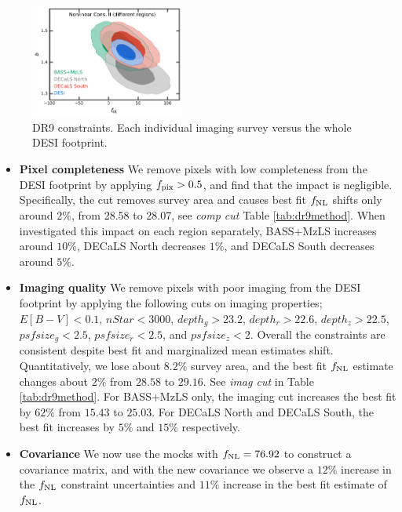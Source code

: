 \begin{figure}
    \centering
    \includegraphics[width=0.45\textwidth]{figures/mcmc_dr9regions.pdf} 
    \caption{DR9 constraints. Each individual imaging survey versus the whole DESI footprint.}\label{fig:mcmc_dr9reg}
\end{figure}

\begin{itemize}
\item \textbf{Pixel completeness}
We remove pixels with low completeness from the DESI footprint by applying $f_{\rm pix}>0.5$, and find that the impact is negligible. Specifically, the cut removes  survey area and causes best fit $f_{\rm NL}$ shifts only around $2\%$, from 28.58 to 28.07, see \textit{comp cut} Table \ref{tab:dr9method}. When investigated this impact on each region separately, BASS+MzLS increases around $10\%$, DECaLS North decreases $1\%$, and DECaLS South decreases around $5\%$.

\item \textbf{Imaging quality}
We remove pixels with poor imaging from the DESI footprint by applying the following cuts on imaging properties; $E[B-V]<0.1$, $nStar < 3000$, $depth_{g} > 23.2$, $depth_{r} > 22.6$, $depth_{z} > 22.5$, $psfsize_{g}<2.5$, $psfsize_{r}<2.5$, and $psfsize_{z}<2$. Overall the constraints are consistent despite best fit and marginalized mean estimates shift. Quantitatively, we lose about $8.2\%$ survey area, and the best fit $f_{\rm NL}$ estimate changes about $2\%$ from $28.58$ to $29.16$. See \textit{imag cut} in Table \ref{tab:dr9method}. For BASS+MzLS only, the imaging cut increases the best fit by $62\%$ from $15.43$ to $25.03$. For DECaLS North and DECaLS South, the best fit increases by $5\%$ and $15\%$ respectively.

\item \textbf{Covariance}
We now use the mocks with $f_{\rm NL}=76.92$ to construct a covariance matrix, and with the new covariance we observe a $12\%$ increase in the $f_{\rm NL}$ constraint uncertainties and $11\%$ increase in the best fit estimate of $f_{\rm NL}$.


\end{itemize}
